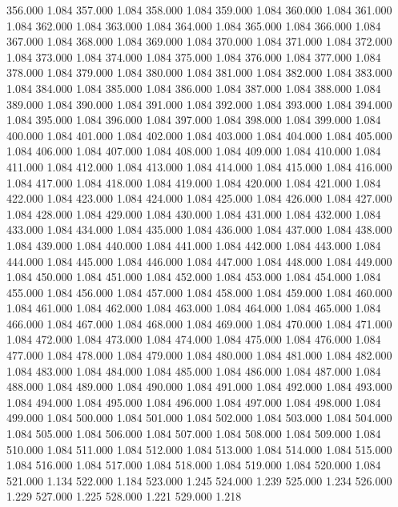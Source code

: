 356.000 1.084 
357.000 1.084 
358.000 1.084 
359.000 1.084 
360.000 1.084 
361.000 1.084 
362.000 1.084 
363.000 1.084 
364.000 1.084 
365.000 1.084 
366.000 1.084 
367.000 1.084 
368.000 1.084 
369.000 1.084 
370.000 1.084 
371.000 1.084 
372.000 1.084 
373.000 1.084 
374.000 1.084 
375.000 1.084 
376.000 1.084 
377.000 1.084 
378.000 1.084 
379.000 1.084 
380.000 1.084 
381.000 1.084 
382.000 1.084 
383.000 1.084 
384.000 1.084 
385.000 1.084 
386.000 1.084 
387.000 1.084 
388.000 1.084 
389.000 1.084 
390.000 1.084 
391.000 1.084 
392.000 1.084 
393.000 1.084 
394.000 1.084 
395.000 1.084 
396.000 1.084 
397.000 1.084 
398.000 1.084 
399.000 1.084 
400.000 1.084 
401.000 1.084 
402.000 1.084 
403.000 1.084 
404.000 1.084 
405.000 1.084 
406.000 1.084 
407.000 1.084 
408.000 1.084 
409.000 1.084 
410.000 1.084 
411.000 1.084 
412.000 1.084 
413.000 1.084 
414.000 1.084 
415.000 1.084 
416.000 1.084 
417.000 1.084 
418.000 1.084 
419.000 1.084 
420.000 1.084 
421.000 1.084 
422.000 1.084 
423.000 1.084 
424.000 1.084 
425.000 1.084 
426.000 1.084 
427.000 1.084 
428.000 1.084 
429.000 1.084 
430.000 1.084 
431.000 1.084 
432.000 1.084 
433.000 1.084 
434.000 1.084 
435.000 1.084 
436.000 1.084 
437.000 1.084 
438.000 1.084 
439.000 1.084 
440.000 1.084 
441.000 1.084 
442.000 1.084 
443.000 1.084 
444.000 1.084 
445.000 1.084 
446.000 1.084 
447.000 1.084 
448.000 1.084 
449.000 1.084 
450.000 1.084 
451.000 1.084 
452.000 1.084 
453.000 1.084 
454.000 1.084 
455.000 1.084 
456.000 1.084 
457.000 1.084 
458.000 1.084 
459.000 1.084 
460.000 1.084 
461.000 1.084 
462.000 1.084 
463.000 1.084 
464.000 1.084 
465.000 1.084 
466.000 1.084 
467.000 1.084 
468.000 1.084 
469.000 1.084 
470.000 1.084 
471.000 1.084 
472.000 1.084 
473.000 1.084 
474.000 1.084 
475.000 1.084 
476.000 1.084 
477.000 1.084 
478.000 1.084 
479.000 1.084 
480.000 1.084 
481.000 1.084 
482.000 1.084 
483.000 1.084 
484.000 1.084 
485.000 1.084 
486.000 1.084 
487.000 1.084 
488.000 1.084 
489.000 1.084 
490.000 1.084 
491.000 1.084 
492.000 1.084 
493.000 1.084 
494.000 1.084 
495.000 1.084 
496.000 1.084 
497.000 1.084 
498.000 1.084 
499.000 1.084 
500.000 1.084 
501.000 1.084 
502.000 1.084 
503.000 1.084 
504.000 1.084 
505.000 1.084 
506.000 1.084 
507.000 1.084 
508.000 1.084 
509.000 1.084 
510.000 1.084 
511.000 1.084 
512.000 1.084 
513.000 1.084 
514.000 1.084 
515.000 1.084 
516.000 1.084 
517.000 1.084 
518.000 1.084 
519.000 1.084 
520.000 1.084 
521.000 1.134 
522.000 1.184 
523.000 1.245 
524.000 1.239 
525.000 1.234 
526.000 1.229 
527.000 1.225 
528.000 1.221 
529.000 1.218 
